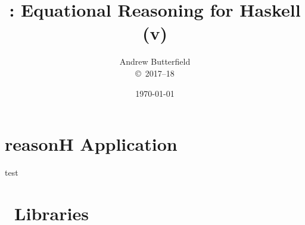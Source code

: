 \documentclass[fleqn,10pt]{report}
\author{
Andrew Butterfield
\\
{\small \copyright\ 2017--18}
}
\title{
  \reasonH: Equational Reasoning for Haskell
  \\(v\hreqVersion)
}
\date{
\today
}
\begin{document}
\maketitle
\tableofcontents

\chapter{reasonH Application}



test


\chapter{\reasonH\ Libraries}


\newpage

\newpage

\newpage

\newpage

\end{document}
